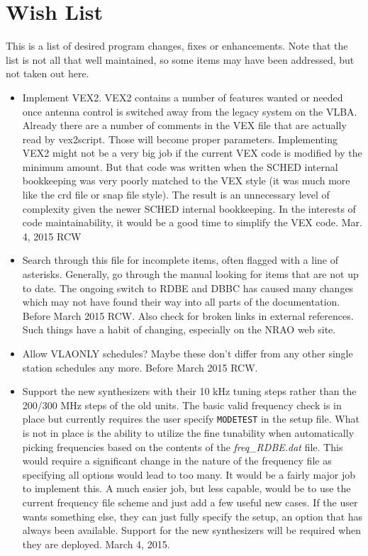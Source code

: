 \documentclass{report}
\begin{document}
\section{\label{SSEC:WISH}Wish List}

This is a list of desired program changes, fixes or enhancements.  Note
that the list is not all that well maintained, so some items may have
been addressed, but not taken out here.


\begin{itemize}

\item Implement VEX2.  VEX2 contains a number of features wanted or 
      needed once antenna control is switched away from the legacy 
      system on the VLBA.  Already there are a number of comments in 
      the VEX file that are actually read by vex2script.  Those will
      become proper parameters.  Implementing VEX2 might not be a 
      very big job if the current VEX code is modified by the minimum
      amount.  But that code was written when the SCHED internal 
      bookkeeping was very poorly matched to the VEX style (it was 
      much more like the crd file or snap file style).  The result is
      an unnecessary level of complexity given the newer SCHED internal
      bookkeeping.   In the interests of code maintainability, it 
      would be a good time to simplify the VEX code.    Mar. 4, 2015 RCW

\item Search through this file for incomplete items, often flagged
      with a line of asterisks.  Generally, go through the manual looking
      for items that are not up to date.  The ongoing switch to RDBE and
      DBBC has caused many changes which may not have found their way into
      all parts of the documentation.  Before March 2015  RCW.
      Also check for broken links in external references.  Such things
      have a habit of changing, especially on the NRAO web site.

\item Allow VLAONLY schedules?  Maybe these don't differ from any other
      single station schedules any more. Before March 2015  RCW.

\item Support the new synthesizers with their 10 kHz tuning steps rather
      than the 200/300 MHz steps of the old units.  The basic valid 
      frequency check is in place but currently requires the user specify
      {\tt MODETEST} in the setup file.  What is not in place is the ability
      to utilize the fine tunability when automatically picking frequencies
      based on the contents of the {\sl freq\_RDBE.dat} file.  This would
      require a significant change in the nature of the frequency file as
      specifying all options would lead to too many.   It would
      be a fairly major job to implement this.  A much easier job, but 
      less capable, would be to use the current frequency file scheme and
      just add a few useful new cases.  If the user wants something else,
      they can just fully specify the setup, an option that has always
      been available.  Support for the new synthesizers will be required
      when they are deployed.  March 4, 2015.


\end{itemize}
\end{document}
